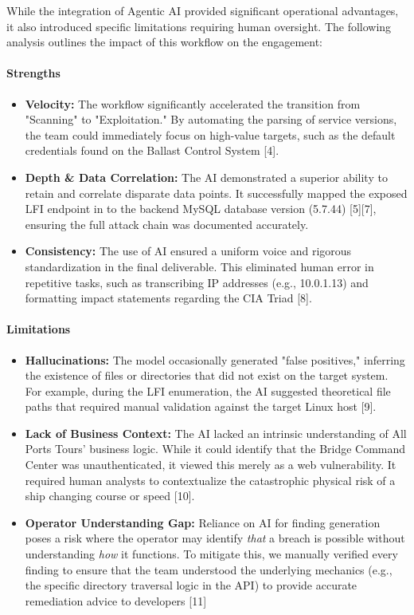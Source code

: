 While the integration of Agentic AI provided significant operational advantages, it also introduced specific limitations requiring human oversight. The following analysis outlines the impact of this workflow on the engagement:

\bigskip


\paragraph{Strengths}

\begin{itemize}
\item \textbf{Velocity:} The workflow significantly accelerated the transition from "Scanning" to "Exploitation." By automating the parsing of service versions, the team could immediately focus on high-value targets, such as the default \texttt{} credentials found on the Ballast Control System [4].\item \textbf{Depth \& Data Correlation:} The AI demonstrated a superior ability to retain and correlate disparate data points. It successfully mapped the exposed LFI endpoint in \texttt{} to the backend MySQL database version (5.7.44) [5][7], ensuring the full attack chain was documented accurately.\item \textbf{Consistency: }The use of AI ensured a uniform voice and rigorous standardization in the final deliverable. This eliminated human error in repetitive tasks, such as transcribing IP addresses (e.g., 10.0.1.13) and formatting impact statements regarding the CIA Triad [8].
\end{itemize}\paragraph{Limitations}

\begin{itemize}
\item \textbf{Hallucinations:} The model occasionally generated "false positives," inferring the existence of files or directories that did not exist on the target system. For example, during the LFI enumeration, the AI suggested theoretical file paths that required manual validation against the target Linux host [9].\item \textbf{Lack of Business Context:} The AI lacked an intrinsic understanding of All Ports Tours' business logic. While it could identify that the Bridge Command Center was unauthenticated, it viewed this merely as a web vulnerability. It required human analysts to contextualize the catastrophic physical risk of a ship changing course or speed [10].\item \textbf{Operator Understanding Gap:} Reliance on AI for finding generation poses a risk where the operator may identify \textit{that} a breach is possible without understanding \textit{how} it functions. To mitigate this, we manually verified every finding to ensure that the team understood the underlying mechanics (e.g., the specific directory traversal logic in the API) to provide accurate remediation advice to developers [11]
\end{itemize}\bigskip

